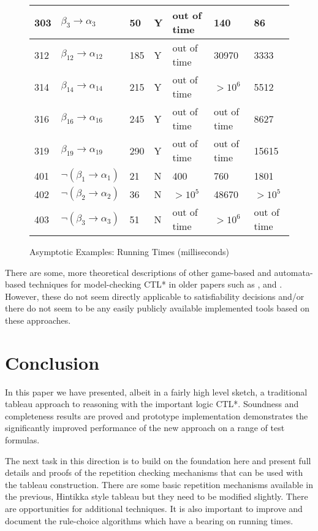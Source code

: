 \documentclass[submission,copyright,creativecommons]{eptcs}
\begin{document}
\begin{figure}
{\begin{tabular}{lllllll}
\hline
303 & $\beta_3 \rightarrow \alpha_3$ & 50  & Y & out of time & 140 & 86 \\
\hline
312& $ \beta_{12} \rightarrow \alpha_{12}$ & 185  & Y & out of time & 30970 & 3333\\
\hline
314 & $ \beta_{14} \rightarrow \alpha_{14}$ & 215  & Y & out of time & $>10^6$ & 5512\\           
\hline
316 & $ \beta_{16} \rightarrow \alpha_{16}$ & 245  & Y & out of time & out of time & 8627 \\   
\hline
319 & $ \beta_{19} \rightarrow \alpha_{19}$ & 290  & Y & out of time & out of time &  15615 \\           
\hline
\hline
401 & $\neg (\beta_1 \rightarrow \alpha_1)$ & 21  & N & 400 & 760 & 1801 \\
\hline
402 & $\neg (\beta_2 \rightarrow \alpha_2)$ & 36  & N & $>10^5$ & 48670 & $>10^5$ \\
\hline
403 & $\neg (\beta_3 \rightarrow \alpha_3)$ & 51  & N & out of time & $>10^6$ & out of time \\
\hline
\end{tabular}
}\caption{Asymptotic Examples: Running Times (milliseconds)}
\label{fig:fllcomp}
\end{figure}


There are some, more theoretical descriptions of 
other game-based and automata-based
techniques for model-checking CTL*
in older papers such as
\cite{Lange00modelchecking},
\cite{DBLP:conf/cav/BernholtzVW94}
and
\cite{DBLP:conf/focs/KupfermanV05}.
However, these do not seem 
directly applicable to satisfiability decisions
and/or there do not seem to be any easily publicly available
implemented tools based on these
approaches.


\section{Conclusion}
\label{sec:concl}

In this paper we have presented, albeit in a fairly high level sketch, a traditional tableau
approach to reasoning with the important logic CTL*.
Soundness and completeness results are proved
and prototype implementation
demonstrates the significantly improved performance of the new approach on
a range of test formulas.

The next task in this direction is
to build on the foundation here and
present full details and proofs of the
repetition checking mechanisms that
can be used with the tableau construction.
There are some basic repetition mechanisms available in the previous, Hintikka style 
tableau
\cite{Rey:startab} but they need to be modified slightly. 
There are opportunities for additional techniques.
It is also important to
improve and document the
rule-choice algorithms which
have a bearing on
running times.
\end{document}
